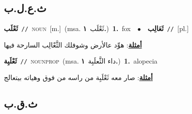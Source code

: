 \documentclass[10pt,a4paper,twoside]{article} %
\begin{document}
\begin{multicols}{2}
\vspace{-3mm}
\subsection*{\color{blue}\foreignlanguage{arabic}{ث.ع.ل.ب}\color{blue}{}} 

{\setlength\topsep{0pt}\textbf{\foreignlanguage{arabic}{ثَعْلَب}}\ {\color{gray}\texttt{//}\color{black}}\ \textsc{noun}\ [m.]\ \color{gray}(msa. \foreignlanguage{arabic}{ثَعْلَب}~\foreignlanguage{arabic}{\textbf{١.}})\color{black}\ \textbf{1.}~fox\ \ $\bullet$\ \ \setlength\topsep{0pt}\textbf{\foreignlanguage{arabic}{ثَعَالِب}}\ {\color{gray}\texttt{//}\color{black}}\ [pl.]\  \begin{flushright}\color{gray}\foreignlanguage{arabic}{\textbf{\underline{\foreignlanguage{arabic}{أمثلة}}}: هوِّد عالأرض وشوفلك الثَّعْالِب السارحة فيها}\end{flushright}\color{black}} \vspace{2mm}

{\setlength\topsep{0pt}\textbf{\foreignlanguage{arabic}{ثَعْلَبِة}}\ {\color{gray}\texttt{//}\color{black}}\ \textsc{noun\textunderscore prop}\ \color{gray}(msa. \foreignlanguage{arabic}{داء الثَّعلَبِة}~\foreignlanguage{arabic}{\textbf{١.}})\color{black}\ \textbf{1.}~alopecia\  \begin{flushright}\color{gray}\foreignlanguage{arabic}{\textbf{\underline{\foreignlanguage{arabic}{أمثلة}}}: صار معه ثَعْلَبِة من راسه من فوق وهياته بيتعالج}\end{flushright}\color{black}} \vspace{2mm}

\vspace{-3mm}
\subsection*{\color{blue}\foreignlanguage{arabic}{ث.ق.ب}\color{blue}{}} 


\end{multicols}
\end{document}

